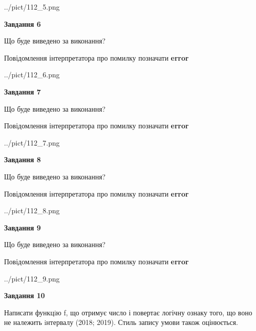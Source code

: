 \documentclass[12pt, ukrainian]{article}
\begin{document}
{\begin {large}
\begin{center}
	{../pict/112_5.png}
\end{center}
\newpage

{\begin {center}\textbf{Завдання 6}\end {center}}\par
Що буде виведено за виконання? \par
Повідомлення інтерпретатора про помилку позначати \textbf{error}

\begin{center}
	{../pict/112_6.png}
\end{center}
\newpage

{\begin {center}\textbf{Завдання 7}\end {center}}\par
Що буде виведено за виконання? \par
Повідомлення інтерпретатора про помилку позначати \textbf{error}

\begin{center}
	{../pict/112_7.png}
\end{center}
\newpage

{\begin {center}\textbf{Завдання 8}\end {center}}\par
Що буде виведено за виконання? \par
Повідомлення інтерпретатора про помилку позначати \textbf{error}

\begin{center}
	{../pict/112_8.png}
\end{center}
\newpage

{\begin {center}\textbf{Завдання 9}\end {center}}\par
Що буде виведено за виконання? \par
Повідомлення інтерпретатора про помилку позначати \textbf{error}

\begin{center}
	{../pict/112_9.png}
\end{center}
\newpage

{\begin {center}\textbf{Завдання 10}\end {center}}\par

Написати функцiю f, що отримує число і повертає логічну ознаку того, що воно не належить iнтервалу (2018; 2019). Стиль запису умови також оцінюється.\par
\newpage

\end {large}}
\end{document}
